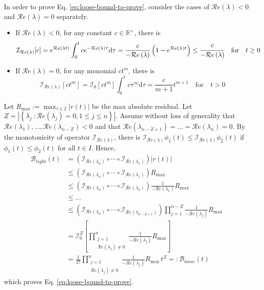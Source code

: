 \documentclass[accepted]{uai2023}
\newcommand{\Bound}{\mathcal{B}}
\newcommand{\I}{\mathcal{I}}
\renewcommand{\Re}[1]{\mathcal{R}e\left(#1\right)}
\begin{document}
In order to prove Eq. \ref{eq:loose-bound-to-prove}, consider the cases of $\Re{\lambda} < 0$ and $\Re{\lambda} = 0$ separately.
\begin{itemize}
    \item If $\Re{\lambda} < 0$, for any constant $c\in \mathbb{R^{+}}$, there is \begin{equation} \I_{\Re{\lambda}} [c] = e^{\Re{\lambda t}} \int_{0}^{t} c e^{-\Re{\lambda}\tau} \mathrm{d}\tau = \frac{c}{-\Re{\lambda}} \left(1 - e^{\Re{\lambda} t}\right) \leq \cfrac{c}{-\Re{\lambda}}\quad \text{for} \quad t\geq0\end{equation}
    \item If $\Re{\lambda} = 0$, for any monomial $c t^{m}$, there is \begin{equation} \I_{\Re{\lambda }}[ct^m] = \I_{0}[ct^m] \int_{0}^{t} c\mathrm{\tau} ^m \mathrm{d}\tau = \frac{c}{m+1}t^{m+1} \quad\text{for}\quad t > 0 \end{equation}
\end{itemize}

Let $\displaystyle R_{\max} := \max_{\tau\in I} |r(t)|$ be the max absolute residual.
Let $Z = |\left\{\lambda_j\ :\Re{\lambda_j} =0,1 \leq j \leq n\right\}|$. 
Assume without loss of generality that $\Re{\lambda_1}, \dots, \Re{\lambda_{n-Z}} < 0$ and that $\Re{\lambda_{n-Z+1}} = \dots = \Re{\lambda_n} = 0$.
By the monotonicity of operator $\I_{\Re{\lambda}}$, there is $\I_{\Re{\lambda}} \phi_1(t) \leq \I_{\Re{\lambda}} \phi_2(t)$ if $\phi_1(t) \leq \phi_2(t)$ for all $t \in I$. Hence, 
\begin{align}
    \Bound_{tight}(t) &= \left(\I_{\Re{\lambda_n}}\circ \cdots \circ\I_{\Re{\lambda_{1}}}\right)\left|r(t)\right| \\
    &\leq \left(\I_{\Re{\lambda_n}}\circ \cdots \circ\I_{\Re{\lambda_{1}}}\right) R_{\max}\\
    &\leq \left(\I_{\Re{\lambda_n}}\circ \cdots \circ\I_{\Re{\lambda_{2}}}\right) \frac{1}{-\Re{\lambda_1}}R_{\max}\\
    &\leq \dots \nonumber \\
    &\leq \left(\I_{\Re{\lambda_n}}\circ \cdots \circ\I_{\Re{\lambda_{n-Z+1}}}\right) \prod_{j=1}^{n-Z}\frac{1}{-\Re{\lambda_j}}R_{\max}\\
    &= \I_0^Z \left[\prod_{\substack{j=1\\ \Re{\lambda_j}\neq 0}}^{n}\frac{1}{-\Re{\lambda_j}}R_{\max}\right]\\
    &= \frac{1}{Z!} \prod_{\substack{j=1\\ \Re{\lambda_j}\neq 0}}^{n}\frac{1}{-\Re{\lambda_j}}R_{\max}\, t^Z =: \Bound_{loose}(t)
\end{align}
which proves Eq. \ref{eq:loose-bound-to-prove}.
\end{document}
